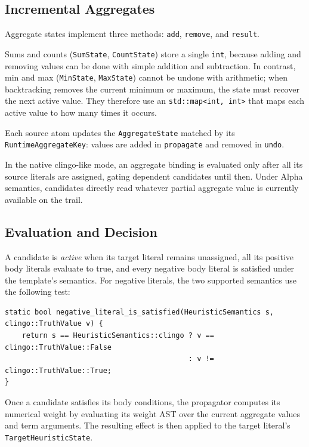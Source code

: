 \subsection{Incremental Aggregates}
Aggregate states implement three methods: \texttt{add}, \texttt{remove}, and \texttt{result}. 

Sums and counts (\texttt{SumState}, \texttt{CountState}) store a single \texttt{int}, because adding and removing values can be done with simple addition and subtraction. In contrast, min and max (\texttt{MinState}, \texttt{MaxState}) cannot be undone with arithmetic; when backtracking removes the current minimum or maximum, the state must recover the next active value. They therefore use an \texttt{std::map<int, int>} that maps each active value to how many times it occurs.

Each source atom updates the \texttt{AggregateState} matched by its \texttt{Runtime\allowbreak Aggregate\allowbreak Key}: values are added in \texttt{propagate} and removed in \texttt{undo}.

In the native clingo-like mode, an aggregate binding is evaluated only after all its source literals are assigned, gating dependent candidates until then. Under Alpha semantics, candidates directly read whatever partial aggregate value is currently available on the trail.

\subsection{Evaluation and Decision}
\label{sec:decision}

A candidate is \emph{active} when its target literal remains unassigned, all its positive body literals evaluate to true, and every negative body literal is satisfied under the template's semantics. For negative literals, the two supported semantics use the following test:

\begin{verbatim}
static bool negative_literal_is_satisfied(HeuristicSemantics s, clingo::TruthValue v) {
    return s == HeuristicSemantics::clingo ? v == clingo::TruthValue::False
                                           : v != clingo::TruthValue::True;
}
\end{verbatim}


Once a candidate satisfies its body conditions, the propagator computes its numerical weight by evaluating its weight AST over the current aggregate values and term arguments. The resulting effect is then applied to the target literal's \texttt{TargetHeuristicState}.

